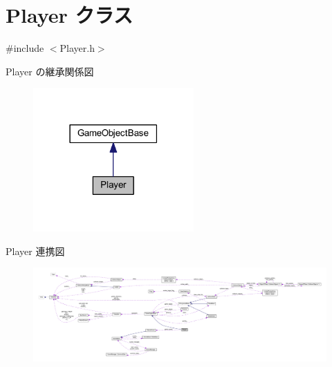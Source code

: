 \hypertarget{class_player}{}\section{Player クラス}
\label{class_player}


{\ttfamily \#include $<$Player.\+h$>$}



Player の継承関係図\nopagebreak
\begin{figure}[H]
\begin{center}
\leavevmode
\includegraphics[width=174pt]{class_player__inherit__graph}
\end{center}
\end{figure}


Player 連携図
\nopagebreak
\begin{figure}[H]
\begin{center}
\leavevmode
\includegraphics[width=350pt]{class_player__coll__graph}
\end{center}
\end{figure}
